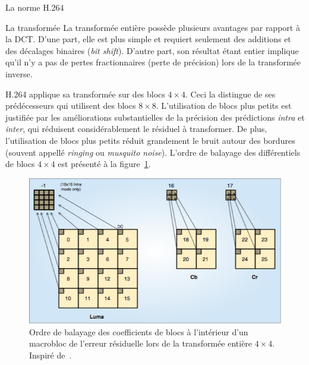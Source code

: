 \documentclass[letterpaper, twoside, 12pt,memoire]{thETS}
\begin{document}
\begin{chapter}{La norme H.264}
\begin{section}{La transformée}
La transformée entière possède plusieurs avantages par rapport à la DCT.
D'une part, elle est plus simple et requiert seulement des additions et
des décalages binaires (\textit{bit shift}). D'autre part, son résultat étant
entier implique qu'il n'y a pas de pertes fractionnaires (perte de précision) lors de la
transformée inverse.

H.264 applique sa transformée sur des blocs $4 \times 4$. Ceci la distingue de
ses prédécesseurs qui utilisent des blocs $8 \times 8$. L'utilisation de blocs
plus petits est justifiée par les améliorations substantielles de la  précision
des prédictions \textit{intra} et \textit{inter}, qui réduisent considérablement
le résiduel à transformer. De plus, l'utilisation de blocs plus petits réduit
grandement le bruit autour des bordures (souvent appellé \textit{ringing} ou
\textit{musquito noise}). L'ordre de balayage des différentiels de blocs $4
\times 4$ est présenté à la figure~\ref{fig-Transform}.

\begin{figure}[htb]
\centering
\includegraphics[width=\linewidth]{images/Transform.png}
\caption{Ordre de balayage des coefficients de blocs à
l'intérieur d'un macrobloc de l'erreur résiduelle lors de la transformée entière
$4 \times 4$. Inspiré de~\cite{richardson2003}.}
\label{fig-Transform}
\end{figure}

\end{section}


\end{chapter}
\end{document}
